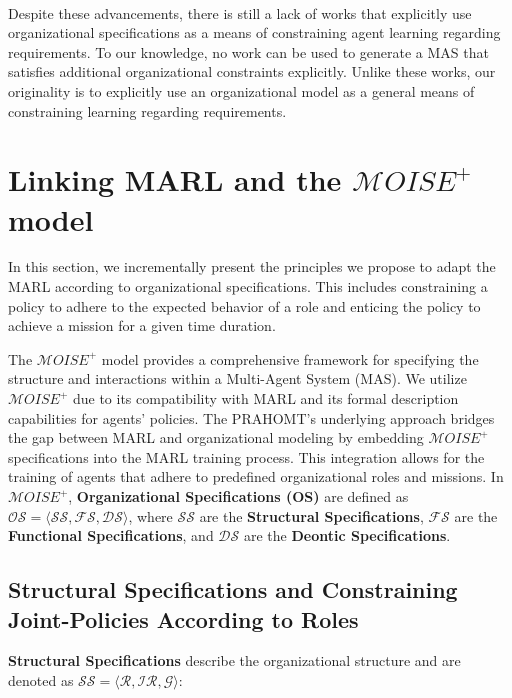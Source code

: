 \documentclass[runningheads]{llncs}
\theoremstyle{freethm}
\theoremstyle{proofoutline}
\begin{document}
\

Despite these advancements, there is still a lack of works that explicitly use organizational specifications as a means of constraining agent learning regarding requirements. To our knowledge, no work can be used to generate a MAS that satisfies additional organizational constraints explicitly. Unlike these works, our originality is to explicitly use an organizational model as a general means of constraining learning regarding requirements.


\section{Linking MARL and the $\mathcal{M}OISE^+$ model}\label{sec:linking_marl_moise}
\label{sec:marl_moise_linking}

In this section, we incrementally present the principles we propose to adapt the MARL according to organizational specifications. This includes constraining a policy to adhere to the expected behavior of a role and enticing the policy to achieve a mission for a given time duration.


The $\mathcal{M}OISE^+$ model provides a comprehensive framework for specifying the structure and interactions within a Multi-Agent System (MAS). We utilize $\mathcal{M}OISE^+$ due to its compatibility with MARL and its formal description capabilities for agents' policies. The PRAHOMT's underlying approach bridges the gap between MARL and organizational modeling by embedding $\mathcal{M}OISE^+$ specifications into the MARL training process. This integration allows for the training of agents that adhere to predefined organizational roles and missions.
%
In $\mathcal{M}OISE^+$, \textbf{Organizational Specifications (OS)} are defined as $\mathcal{OS} = \langle \mathcal{SS}, \mathcal{FS}, \mathcal{DS} \rangle$, where $\mathcal{SS}$ are the \textbf{Structural Specifications}, $\mathcal{FS}$ are the \textbf{Functional Specifications}, and $\mathcal{DS}$ are the \textbf{Deontic Specifications}.

\subsection{Structural Specifications and Constraining Joint-Policies According to Roles}

\textbf{Structural Specifications} describe the organizational structure and are denoted as $\mathcal{SS} = \langle \mathcal{R}, \mathcal{IR}, \mathcal{G} \rangle$:
\end{document}

